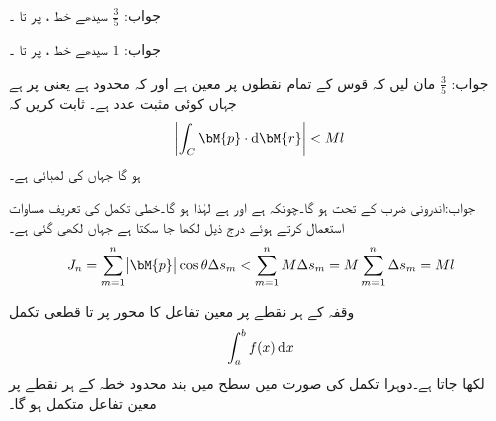 جواب:\quad
$\tfrac{3}{5}$
سیدھے خط ،  پر  تا ۔

جواب:\quad
$1$
سیدھے خط ،  پر  تا ۔

جواب:\quad
$\tfrac{3}{5}$
مان لیں کہ قوس  کے تمام نقطوں  پر  معین ہے اور کہ  محدود ہے یعنی  پر  ہے جہاں  کوئی مثبت عدد ہے۔ ثابت کریں کہ 
\begin{align}
\abs{\int_C \bM{p}\cdot \dif \bM{r}} < Ml
\end{align}
ہو گا جہاں  کی لمبائی  ہے۔

جواب:اندرونی ضرب کے تحت  ہو گا۔چونکہ  ہے اور  ہے لہٰذا  ہو گا۔خطی تکمل کی تعریف مساوات  استعمال کرتے ہوئے  درج ذیل لکھا جا سکتا ہے جہاں  لکھی گئی ہے۔
\begin{align*}
J_n=\sum_{m=1}^{n} \abs{\bM{p}}\cos \theta \Delta s_m < \sum_{m=1}^{n} M \Delta s_m =M\sum_{m=1}^{n}  \Delta s_m =Ml
\end{align*}

وقفہ  کے ہر نقطے پر معین تفاعل  کا  محور پر  تا  قطعی تکمل 
\begin{align*}
\int_a^b f(x)\dif x
\end{align*}
لکھا جاتا ہے۔دوہرا تکمل کی صورت میں  سطح میں بند محدود خطہ  کے ہر نقطے پر معین تفاعل  متکمل ہو گا۔


